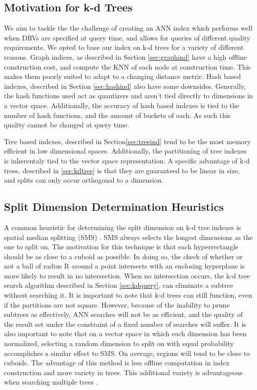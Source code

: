 \subsection{Motivation for k-d Trees}
\label{sec:kdtreemotiv}

We aim to tackle the the challenge of creating an ANN index which performs well when DRVs are specified at query time, and allows for queries of different quality requirements.  We opted to base our index on k-d trees for a variety of different reasons.  Graph indices, as described in Section \ref{sec:graphind} have a high offline construction cost, and compute the KNN of each node at construction time.  This makes them poorly suited to adapt to a changing distance metric.  Hash based indexes, described in Section \ref{sec:hashind} also have some downsides.  Generally, the hash functions used act as quantizers and aren't tied directly to dimensions in a vector space.  Additionally, the accuracy of hash based indexes is tied to the number of hash functions, and the amount of buckets of each.  As such this quality cannot be changed at query time.

Tree based indexes, described in Section\ref{sec:treeind} tend to be the most memory efficient in low dimensional spaces.  Additionally, the partitioning of tree indexes is inherentaly tied to the vector space representation.  A specific advantage of k-d trees, described in \ref{sec:kdtree} is that they are guaranteed to be linear in size, and splits can only occur orthogonal to a dimension.

\subsection{Split Dimension Determination Heuristics}
\label{section:splitdim}

A common heuristic for determining the split dimension on k-d tree indexes is spatial median splitting (SMS) \citep{zhou2008real,wald2006building}.  SMS always selects the longest dimensions as the one to split on.  The motivation for this technique is that each hyperrectangle should be as close to a cuboid as possible.  In doing so, the check of whether or not a ball of radius R around a point intersects with an enclosing hyperplane is more likely to result in no intersection.  When no intersection occurs, the k-d tree search algorithm described in Section \ref{sec:kdquery}, can eliminate a subtree without searching it.  It is important to note that k-d trees can still function, even if the partitions are not square.  However, because of the inability to prune subtrees as effectively, ANN searches will not be as efficient, and the quality of the result set under the constraint of a fixed number of searches will suffer.  It is also important to note that on a vector space in which each dimension has been normalized, selecting a random dimension to split on with equal probability accomplishes a similar effect to SMS.  On average, regions will tend to be close to cuboids. The advantage of this method is less offline computation in index construction and more variety in trees.  This additional variety is advantageous when searching multiple trees \citep{flann_pami_2014}.

